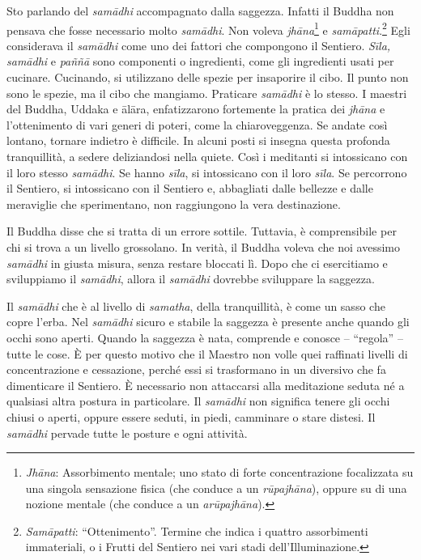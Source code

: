 Sto parlando del \emph{samādhi} accompagnato dalla saggezza. Infatti il
Buddha non pensava che fosse necessario molto \emph{samādhi}. Non voleva
\emph{jhāna}\footnote{%
  \emph{Jhāna}: Assorbimento mentale; uno stato di
  forte concentrazione focalizzata su una singola sensazione fisica (che
  conduce a un \emph{rūpajhāna}), oppure su di una nozione mentale (che
  conduce a un \emph{arūpajhāna}).}
e \emph{samāpatti}.\footnote{%
  \emph{Samāpatti}: ``Ottenimento''. Termine che indica i quattro assorbimenti
  immateriali, o i Frutti del Sentiero nei vari stadi
  dell'Illuminazione.}
Egli considerava il \emph{samādhi} come uno dei
fattori che compongono il Sentiero. \emph{Sīla,} \emph{samādhi} e
\emph{paññā} sono componenti o ingredienti, come gli ingredienti usati
per cucinare. Cucinando, si utilizzano delle spezie per insaporire il
cibo. Il punto non sono le spezie, ma il cibo che mangiamo. Praticare
\emph{samādhi} è lo stesso. I maestri del Buddha, Uddaka e ālāra,
enfatizzarono fortemente la pratica dei \emph{jhāna} e l'ottenimento di
vari generi di poteri, come la chiaroveggenza. Se andate così lontano,
tornare indietro è difficile. In alcuni posti si insegna questa profonda
tranquillità, a sedere deliziandosi nella quiete. Così i meditanti si
intossicano con il loro stesso \emph{samādhi}. Se hanno \emph{sīla}, si
intossicano con il loro \emph{sīla}. Se percorrono il Sentiero, si
intossicano con il Sentiero e, abbagliati dalle bellezze e dalle
meraviglie che sperimentano, non raggiungono la vera destinazione.

Il Buddha disse che si tratta di un errore sottile. Tuttavia, è
comprensibile per chi si trova a un livello grossolano. In verità, il
Buddha voleva che noi avessimo \emph{samādhi} in giusta misura, senza
restare bloccati lì. Dopo che ci esercitiamo e sviluppiamo il
\emph{samādhi}, allora il \emph{samādhi} dovrebbe sviluppare la
saggezza.

Il \emph{samādhi} che è al livello di \emph{samatha}, della
tranquillità, è come un sasso che copre l'erba. Nel \emph{samādhi}
sicuro e stabile la saggezza è presente anche quando gli occhi sono
aperti. Quando la saggezza è nata, comprende e conosce -- ``regola'' --
tutte le cose. È per questo motivo che il Maestro non volle quei
raffinati livelli di concentrazione e cessazione, perché essi si
trasformano in un diversivo che fa dimenticare il Sentiero. È necessario
non attaccarsi alla meditazione seduta né a qualsiasi altra postura in
particolare. Il \emph{samādhi} non significa tenere gli occhi chiusi o
aperti, oppure essere seduti, in piedi, camminare o stare distesi. Il
\emph{samādhi} pervade tutte le posture e ogni attività.

